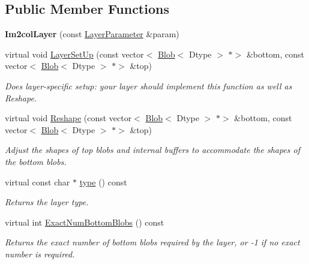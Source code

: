 \subsection*{Public Member Functions}
\begin{DoxyCompactItemize}
\item 
\mbox{\label{classcaffe_1_1_im2col_layer_aec089ca3ca3caf3d32193b9dcb2f98e1}} 
{\bfseries Im2col\+Layer} (const \mbox{\hyperlink{classcaffe_1_1_layer_parameter}{Layer\+Parameter}} \&param)
\item 
virtual void \mbox{\hyperlink{classcaffe_1_1_im2col_layer_ac4d6f34378681fa197546468b5aa6fd6}{Layer\+Set\+Up}} (const vector$<$ \mbox{\hyperlink{classcaffe_1_1_blob}{Blob}}$<$ Dtype $>$ $\ast$$>$ \&bottom, const vector$<$ \mbox{\hyperlink{classcaffe_1_1_blob}{Blob}}$<$ Dtype $>$ $\ast$$>$ \&top)
\begin{DoxyCompactList}\small\item\em Does layer-\/specific setup\+: your layer should implement this function as well as Reshape. \end{DoxyCompactList}\item 
virtual void \mbox{\hyperlink{classcaffe_1_1_im2col_layer_a119c9e1965e219be1ccb719821d4542f}{Reshape}} (const vector$<$ \mbox{\hyperlink{classcaffe_1_1_blob}{Blob}}$<$ Dtype $>$ $\ast$$>$ \&bottom, const vector$<$ \mbox{\hyperlink{classcaffe_1_1_blob}{Blob}}$<$ Dtype $>$ $\ast$$>$ \&top)
\begin{DoxyCompactList}\small\item\em Adjust the shapes of top blobs and internal buffers to accommodate the shapes of the bottom blobs. \end{DoxyCompactList}\item 
\mbox{\label{classcaffe_1_1_im2col_layer_a8f3b31bc7134edbc8e3286b2c65e294e}} 
virtual const char $\ast$ \mbox{\hyperlink{classcaffe_1_1_im2col_layer_a8f3b31bc7134edbc8e3286b2c65e294e}{type}} () const
\begin{DoxyCompactList}\small\item\em Returns the layer type. \end{DoxyCompactList}\item 
virtual int \mbox{\hyperlink{classcaffe_1_1_im2col_layer_a35772d667af49afe707c7b1db881c573}{Exact\+Num\+Bottom\+Blobs}} () const
\begin{DoxyCompactList}\small\item\em Returns the exact number of bottom blobs required by the layer, or -\/1 if no exact number is required. \end{DoxyCompactList}\item 

\end{DoxyCompactItemize}
